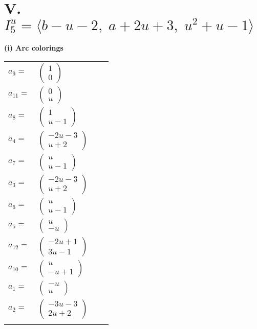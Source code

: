 \documentclass[1p]{elsarticle_modified}
\theoremstyle{definition}
\begin{document}
\centering \section*{V. $I^u_{5}= \langle b- u-2,\;a+2 u+3,\;u^2+u-1 \rangle$}
\flushleft \textbf{(i) Arc colorings}\\
\begin{tabular}{m{7pt} m{180pt} m{7pt} m{180pt} }
\flushright $a_{9}=$&$\begin{pmatrix}1\\0\end{pmatrix}$ \\
\flushright $a_{11}=$&$\begin{pmatrix}0\\u\end{pmatrix}$ \\
\flushright $a_{8}=$&$\begin{pmatrix}1\\u-1\end{pmatrix}$ \\
\flushright $a_{4}=$&$\begin{pmatrix}-2 u-3\\u+2\end{pmatrix}$ \\
\flushright $a_{7}=$&$\begin{pmatrix}u\\u-1\end{pmatrix}$ \\
\flushright $a_{3}=$&$\begin{pmatrix}-2 u-3\\u+2\end{pmatrix}$ \\
\flushright $a_{6}=$&$\begin{pmatrix}u\\u-1\end{pmatrix}$ \\
\flushright $a_{5}=$&$\begin{pmatrix}u\\- u\end{pmatrix}$ \\
\flushright $a_{12}=$&$\begin{pmatrix}-2 u+1\\3 u-1\end{pmatrix}$ \\
\flushright $a_{10}=$&$\begin{pmatrix}u\\- u+1\end{pmatrix}$ \\
\flushright $a_{1}=$&$\begin{pmatrix}- u\\u\end{pmatrix}$ \\
\flushright $a_{2}=$&$\begin{pmatrix}-3 u-3\\2 u+2\end{pmatrix}$\\&\end{tabular}
\end{document}
